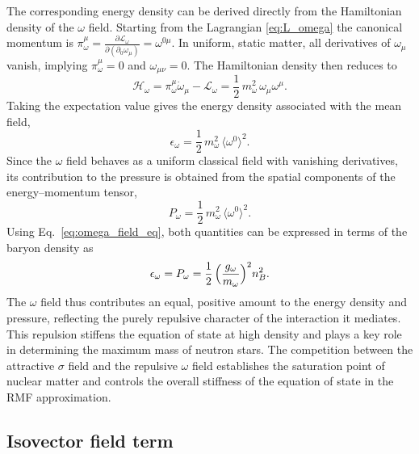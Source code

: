 The corresponding energy density can be derived directly from the Hamiltonian
density of the $\omega$ field. Starting from the Lagrangian \eqref{eq:L_omega}
the canonical momentum is
$\pi_{\omega}^{\mu} = \frac{\partial\mathcal{L}_{\omega}}{\partial(\partial_{0}\omega_{\mu})}
= \omega^{0\mu}$.
In uniform, static matter, all derivatives of $\omega_{\mu}$ vanish, implying
$\pi_{\omega}^{\mu}=0$ and $\omega_{\mu\nu}=0$. The Hamiltonian density then
reduces to
\[
\mathcal{H}_{\omega} = \pi_{\omega}^{\mu}\dot{\omega}_{\mu} - \mathcal{L}_{\omega}
= \frac{1}{2}\,m_{\omega}^{2}\,\omega_{\mu}\omega^{\mu}.
\]
Taking the expectation value gives the energy density associated with the mean
field,
\begin{equation}
\epsilon_{\omega}
= \frac{1}{2}\,m_{\omega}^{2}\,\langle\omega^{0}\rangle^{2}.
\label{eq:epsilon_omega}
\end{equation}
Since the $\omega$ field behaves as a uniform classical field with vanishing
derivatives, its contribution to the pressure is obtained from the spatial
components of the energy–momentum tensor,
\begin{equation}
P_{\omega}
= \frac{1}{2}\,m_{\omega}^{2}\,\langle\omega^{0}\rangle^{2}.
\label{eq:pressure_omega}
\end{equation}
Using Eq.~\eqref{eq:omega_field_eq}, both quantities can be expressed in terms
of the baryon density as
\[
\epsilon_{\omega} = P_{\omega}
= \frac{1}{2}\,\Bigl(\frac{g_{\omega}}{m_{\omega}}\Bigr)^{2} n_{B}^{2}.
\]
The $\omega$ field thus contributes an equal, positive amount to the energy
density and pressure, reflecting the purely repulsive character of the
interaction it mediates. This repulsion stiffens the equation of state at high
density and plays a key role in determining the maximum mass of neutron stars.
The competition between the attractive $\sigma$ field and the repulsive
$\omega$ field establishes the saturation point of nuclear matter and controls
the overall stiffness of the equation of state in the RMF approximation.

\subsection*{Isovector field term}
\label{subsec:rho_term}

